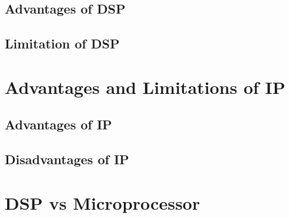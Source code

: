 \documentclass{article}
\begin{document}
\begin{multicols}{2}
        \subsection{Advantages of DSP}
        \subsection{Limitation of DSP}
    \section{Advantages and Limitations of IP} 
        \subsection{Advantages of IP} 
        \subsection{Disadvantages of IP} 
    \section{DSP vs Microprocessor}
    \end{multicols}
\end{document}
